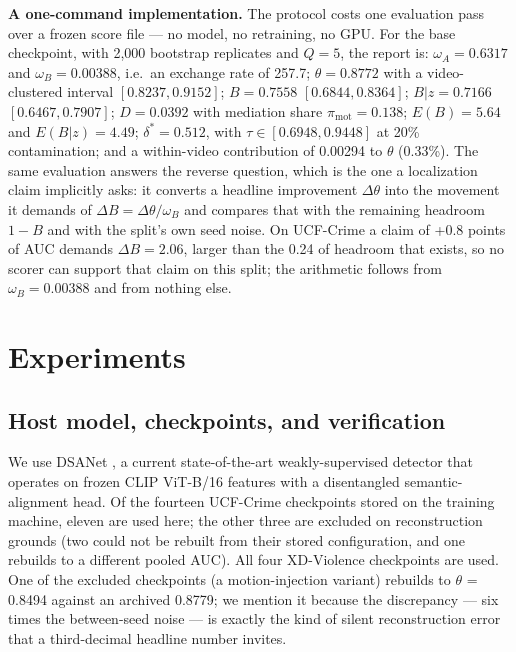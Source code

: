 \documentclass[number,preprint,12pt]{elsarticle}
\begin{document}
\textbf{A one-command implementation.} The protocol costs one evaluation pass over a
frozen score file --- no model, no retraining, no GPU. For the base checkpoint,
with 2,000 bootstrap replicates and \(Q=5\), the report is: \(\omega_A=0.6317\) and
\(\omega_B=0.00388\), i.e.~an exchange rate of 257.7; \(\theta=0.8772\) with a
video-clustered interval \([0.8237,0.9152]\); \(B=0.7558\) \([0.6844,0.8364]\);
\(B|z=0.7166\) \([0.6467,0.7907]\); \(D=0.0392\) with mediation share
\(\pi_{\mathrm{mot}}=0.138\); \(E(B)=5.64\) and \(E(B|z)=4.49\);
\(\delta^{*}=0.512\), with \(\tau\in[0.6948,0.9448]\) at 20\% contamination; and a
within-video contribution of 0.00294 to \(\theta\) (0.33\%). The same evaluation
answers the reverse question, which is the one a localization claim implicitly
asks: it converts a headline improvement \(\Delta\theta\) into the movement it
demands of \(\Delta B=\Delta\theta/\omega_B\) and compares that with the remaining
headroom \(1-B\) and with the split's own seed noise. On UCF-Crime a claim of +0.8
points of AUC demands \(\Delta B=2.06\), larger than the 0.24 of headroom that
exists, so no scorer can support that claim on this split; the arithmetic follows
from \(\omega_B=0.00388\) and from nothing else.

\section{Experiments}\label{sec:exp}

\subsection{Host model, checkpoints, and verification}\label{sec:host}

We use DSANet \citep{yin2026dsanet}, a current state-of-the-art weakly-supervised detector
that operates on frozen CLIP ViT-B/16 features with a disentangled
semantic-alignment head. Of the fourteen UCF-Crime checkpoints stored on the
training machine, eleven are used here; the other three are excluded on
reconstruction grounds (two could not be rebuilt from their stored
configuration, and one rebuilds to a different pooled AUC). All four
XD-Violence checkpoints are used.
One of the excluded checkpoints (a motion-injection variant) rebuilds to
\(\theta\) = 0.8494 against an archived 0.8779; we mention it because the
discrepancy --- six times the between-seed noise --- is exactly the kind of
silent reconstruction error that a third-decimal headline number invites.
\end{document}
